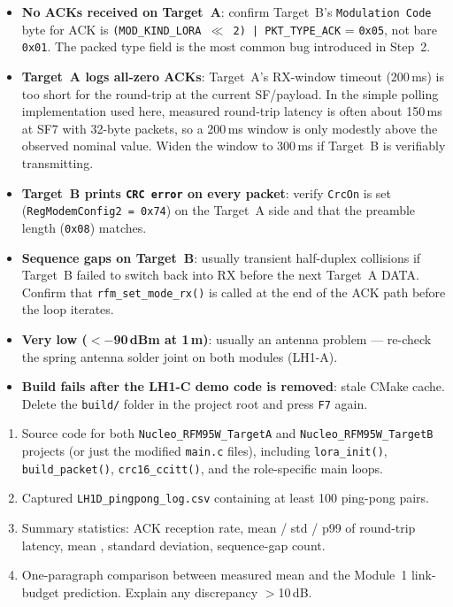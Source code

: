 \documentclass[11pt,letterpaper]{article}
\begin{document}
\begin{tcolorbox}[warning={Troubleshooting}]
	\begin{itemize}[leftmargin=1.2em]
		\item \textbf{No ACKs received on Target~A}: confirm Target~B's \texttt{Modulation Code} byte for ACK is \texttt{(MOD\_KIND\_LORA $\ll$ 2) | PKT\_TYPE\_ACK} = \texttt{0x05}, not bare \texttt{0x01}. The packed type field is the most common bug introduced in Step~2.
        \item \textbf{Target~A logs all-zero ACKs}: Target~A's RX-window timeout (200\,ms) is too short for the round-trip at the current SF/payload. In the simple polling implementation used here, measured round-trip latency is often about 150\,ms at SF7 with 32-byte packets, so a 200\,ms window is only modestly above the observed nominal value. Widen the window to 300\,ms if Target~B is verifiably transmitting.
		\item \textbf{Target~B prints \texttt{CRC error} on every packet}: verify \texttt{CrcOn} is set (\texttt{RegModemConfig2 = 0x74}) on the Target~A side and that the preamble length (\texttt{0x08}) matches.
		\item \textbf{Sequence gaps on Target~B}: usually transient half-duplex collisions if Target~B failed to switch back into RX before the next Target~A DATA. Confirm that \texttt{rfm\_set\_mode\_rx()} is called at the end of the ACK path before the loop iterates.
		\item \textbf{Very low \RSSI{} ($<-$90\,dBm at 1\,m)}: usually an antenna problem --- re-check the spring antenna solder joint on both modules (LH1-A).
		\item \textbf{Build fails after the LH1-C demo code is removed}: stale \mbox{CMake} cache. Delete the \texttt{build/} folder in the project root and press \texttt{F7} again.
	\end{itemize}
\end{tcolorbox}

\newpage
\begin{tcolorbox}[deliverable={Lab Handout 1-D Deliverable}]
	\begin{enumerate}[leftmargin=1.2em]
		\item Source code for both \texttt{Nucleo\_RFM95W\_TargetA} and \texttt{Nucleo\_RFM95W\_TargetB} projects (or just the modified \texttt{main.c} files), including \texttt{lora\_init()}, \texttt{build\_packet()}, \texttt{crc16\_ccitt()}, and the role-specific main loops.
		\item Captured \texttt{LH1D\_pingpong\_log.csv} containing at least 100 ping-pong pairs.
		\item Summary statistics: ACK reception rate, mean / std / p99 of round-trip latency, mean \RSSI{}, \RSSI{} standard deviation, sequence-gap count.
		\item One-paragraph comparison between measured mean \RSSI{} and the Module~1 link-budget prediction. Explain any discrepancy $>$10\,dB.
	\end{enumerate}
\end{tcolorbox}

\printhandoutglossary
\end{document}
